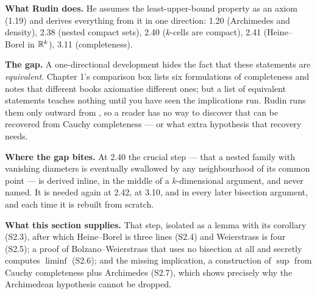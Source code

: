 \begin{center}
\end{center}


\begin{roadmap}
\raggedright
\textbf{What Rudin does.} He assumes the least-upper-bound property as an
axiom (1.19) and derives everything from it in one direction: 1.20
(Archimedes and density), 2.38 (nested compact sets), 2.40 ($k$-cells are
compact), 2.41 (Heine--Borel in $\mathbb{R}^k$), 3.11 (completeness).

\smallskip
\textbf{The gap.} A one-directional development hides the fact that these
statements are \emph{equivalent}. Chapter 1's comparison box lists six
formulations of completeness and notes that different books axiomatise
different ones; but a list of equivalent statements teaches nothing until
you have seen the implications run. Rudin runs them only outward from
\lub{}, so a reader has no way to discover that \lub{} can be recovered from
Cauchy completeness --- or what extra hypothesis that recovery needs.

\smallskip
\textbf{Where the gap bites.} At 2.40 the crucial step --- that a nested
family with vanishing diameters is eventually swallowed by any neighbourhood
of its common point --- is derived inline, in the middle of a
$k$-dimensional argument, and never named. It is needed again at 2.42, at
3.10, and in every later bisection argument, and each time it is rebuilt from
scratch.

\smallskip
\textbf{What this section supplies.} That step, isolated as a lemma with its
corollary (S2.3), after which Heine--Borel is three lines (S2.4) and
Weierstrass is four (S2.5); a proof of Bolzano--Weierstrass that uses no
bisection at all and secretly computes $\liminf$ (S2.6); and the missing
implication, a construction of $\sup$ from Cauchy completeness plus
Archimedes (S2.7), which shows precisely why the Archimedean hypothesis
cannot be dropped.
\end{roadmap}

